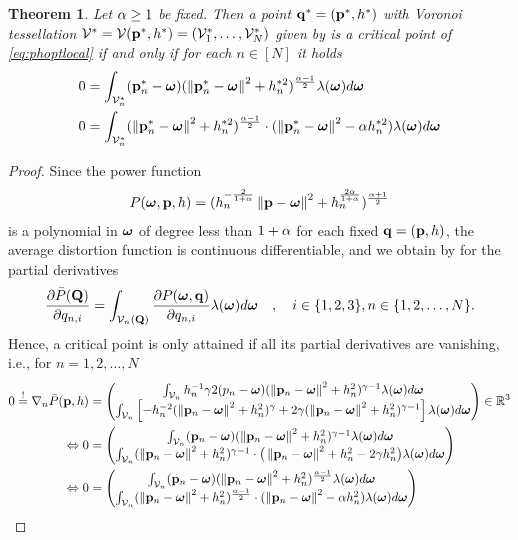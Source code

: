 \documentclass[smallabstract,smallcaptions]{dccpaper}
\newtheorem{theorem}{Theorem}
\newcommand{\df}{\ensuremath{\lam}}         %
\newcommand{\Pbar}{\ensuremath{\bar{P}}}         %
\newcommand{\Vor}{\ensuremath{\mathcal{V}}}         %
\begin{document}
\begin{theorem}\label{thm:necessarycond}
  Let $\alpha \geq 1$ be fixed. Then a point ${\mathbf q}^*=({\mathbf p}^*,h^*)$ with Voronoi tessellation
  $\Vor^*=\Vor(\vp^*,h^*)=(\Vor_1^*,\dots,\Vor^*_N)$ given by  is a critical point of
  \eqref{eq:phoptlocal} if  and only if for each $n\in[N]$ it holds
  \begin{align}
    0&= \int_{\Vor^*_n} (\vp^*_{n}-\vome) (\Norm{\vp^*_n-\vome}^2 +h_n^{*2})^{\frac{\alp-1}{2}} \df(\vome)d \vome\\
    0&= \int_{\Vor^*_n} (\Norm{\vp^*_n-\vome}^2 +h_n^{*2})^{\frac{\alp-1}{2}}\cdot (\Norm{\vp_n^*-\vome}^2 - \alp
    h_n^{*2} ) \df(\vome)d\vome
  \label{eq:criticalpoint}
  \end{align}
\end{theorem}
%
\begin{proof}
Since the power function 
%
\begin{align}
  P(\boldsymbol{ \omega},{\mathbf p},h)= (h_n^{-\frac{2}{1+\alpha}} \left\|{\mathbf p}-\boldsymbol{ \omega}\right\| ^2 + h_n^{\frac{2\alpha}{1+\alpha}})^{\frac{\alpha+1}{2}}
\end{align}  
%
is a polynomial in $\boldsymbol{ \omega}$ of degree less than $1+\alpha$ for each fixed ${\mathbf q}=({\mathbf p},h)$, the average distortion function is continuous
differentiable, and we obtain by \cite[Thm.1]{WJ18} for the partial derivatives 
%
\begin{align}
  \frac{\partial \Pbar(\vQ)}{\partial q_{n,i}} = \int_{\Vor_n(\vQ)} \frac{\partial P(\vome,\vq)}{\partial q_{n,i}}
  \df(\vome)d\vome\quad,\quad i\in\{1,2,3\},n\in\{1,2,\dots,N\}.
\end{align}
%
Hence, a critical point is only attained if all its partial derivatives are vanishing, i.e.,  for  $n=1,2,\dots,N$ 
%
\begin{align}
 0\overset{!}{=} \nabla_n \Pbar(\vp,h) &= \begin{pmatrix} 
   \int_{\Vor_n} h_n^{-1} \gam 2 (p_{n}-\vome)  (\Norm{\vp_n-\vome}^2 +h_n^2)^{\gam-1}  \df(\vome)d \vome\\
    \int_{\Vor_n} \left[-h_n^{-2}(\Norm{\vp_n-\vome}^2 + h_n^2)^{\gam} + 2\gam (\Norm{\vp_n-\vome}^2 +h_n^2)^{\gam-1}\right]
    \df(\vome)d \vome
  \end{pmatrix} \in\R^3\notag\\
\LRA 0&= \begin{pmatrix}
  \int_{\Vor_n} (\vp_{n}-\vome) (\Norm{\vp_n-\vome}^2 +h_n^2)^{\gam-1} \df(\vome)d \vome\\
  \int_{\Vor_n} (\Norm{\vp_n-\vome}^2 +h_n^2)^{\gam-1}\cdot \big(\Norm{\vp_n-\vome}^2+h_n^2 - 2\gam h_n^2 \big)
  \df(\vome)d \vome
 \end{pmatrix}\notag\\
 \LRA 0&= \begin{pmatrix}
   \int_{\Vor_n} (\vp_{n}-\vome) (\Norm{\vp_n-\vome}^2 +h_n^2)^{\frac{\alp-1}{2}} \df(\vome)d \vome\\
   \int_{\Vor_n} (\Norm{\vp_n-\vome}^2 +h_n^2)^{\frac{\alp-1}{2}}\cdot (\Norm{\vp_n-\vome}^2 - \alp h_n^2 )
   \df(\vome)d \vome
  \end{pmatrix}\label{eq:graddph}
\end{align}
%
\end{proof}
\end{document}
